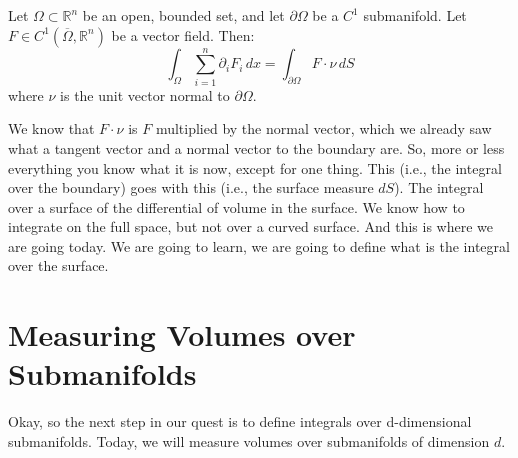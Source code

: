 \begin{math-stroke}
\begin{nice-box}
\begin{theorem}
Let $\Omega \subset \mathbb{R}^n$ be an open, bounded set, and let $\partial\Omega$ be a $C^1$ submanifold.
Let $F \in C^1(\overline{\Omega}, \mathbb{R}^n)$ be a vector field. Then:
\[
\int_{\Omega} \sum_{i=1}^n \partial_i F_i \, dx = \int_{\partial\Omega} F \cdot \nu \, dS
\]
where $\nu$ is the unit vector normal to $\partial\Omega$.
\end{theorem}
\end{nice-box}
\begin{center}
\end{center}
\end{math-stroke}

\begin{spoken-clean}[00:01:50 - 00:02:19]
We know that $F \cdot \nu$ is $F$ multiplied by the normal vector, which we already saw what a tangent vector and a normal vector to the boundary are. So, more or less everything you know what it is now, except for one thing. This (i.e., the integral over the boundary) goes with this (i.e., the surface measure $dS$). The integral over a surface of the differential of volume in the surface. We know how to integrate on the full space, but not over a curved surface. And this is where we are going today. We are going to learn, we are going to define what is the integral over the surface.
\end{spoken-clean}

\section{Measuring Volumes over Submanifolds}

\begin{spoken-clean}[02:19 - 03:27]
Okay, so the next step in our quest is to define integrals over d-dimensional submanifolds. Today, we will measure volumes over submanifolds of dimension $d$.
\end{spoken-clean}

